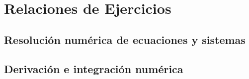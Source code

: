 \documentclass[12pt]{book}
\begin{document}

    
    

    \renewcommand{\theejercicio}{%
    \ifnum\value{section}=0 %
        \arabic{ejercicio}%
    \else
        \thesubsection.\arabic{ejercicio}%
    \fi
    }

    \fancyhead[R]{\helv \nouppercase{\rightmark}}
    \chapter{Relaciones de Ejercicios}
    \section{Resolución numérica de ecuaciones y sistemas}
    
    
    \newpage
    \section{Derivación e integración numérica}
    
    
\end{document}
